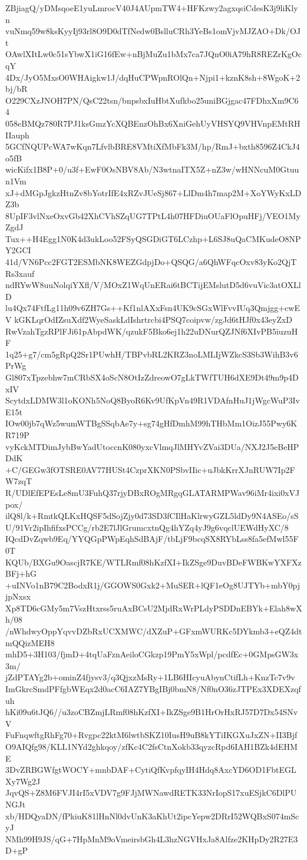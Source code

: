 ZBjiagQ/yDMsqoeE1yuLmrocV40J4AUpmTW4+HFKzwy2agxqsiCdesK3j9liKlyn
vuNmq59w8ksKyyIj93rl8O9D0dTfNedw0BslluCRh3YeBs1omVjvMJZAO+Dk/OJt
OAwlXItLw0c51sYbwX1iG16fEw+nBjMuZu1bMx7ca7JQnO0iA79hR8REZrKgOcqY
4Dx/JyO5MxsO0WHAigkw1J/dqHuCPWpnROlQn+Njpi1+kznK8sh+8WgoK+2bj/bR
O229CXzJNOH7PN/QsC22tsn/bnpsbxIuHbtXufkbo25uniBGjgac47FDhxXm9C64
058eBMQz780R7PJ1ksGmzYcXQBEnzOhBx6XniGehUyVHSYQ9VHVnpEMtRHIIauph
5GCfNQUPcWA7wKqn7LfvlbBRE8VMtiXfMbFk3M/hp/RmJ+bxth8596Z4CkJ4o5fB
wicKifx1B8P+0/u3f+EwF0OsNBV8Ab/N3wtnaITX5Z+nZ3w/wHNNcuM0Gtuun1Vm
xJ+dMGpJgkzHtnZv8bYotrIfE4xRZvJUeSj867+LlDm4h7map2M+XoYWyKxLDZ3b
8UpIF3vlNxeOxvGb42XhCVhSZqUG7TPtL4h07HFDiuOUaFlOpuHFj/VEO1MyZgdJ
Tux++H4Egg1N0K4d3ukLoo52FSyQSGDiGT6LCzhp+L6SJ8uQaCMKudeO8NPY2GCI
41d/VN6Pcc2FGT2ESMbNK8WEZGdpjDo+QSQG/a6QhWFqcOxv83yKo2QjTRs3xauf
ndRYwW8uuNolqiYXfl/V/MOxZ1WqUnERai6tBCTijEMslutD5d6vuVic3atOXLlD
lu4Qx74FtfLg11h09v6ZH7Gs++Kf1nlAXxFsn4UK9cSGxWlFvvIUq3Qmjgg+cwEV
kGKLqrOdIZsuXdf2WyeSaskLdIshrtrcbi4PSQ7coipvw/zgJd6tHJf0x43eyZxD
RwVzahTgzRPlFJi61pAbpdWK/qzukF5Bko6ej1h22uDNurQZJNf6XIvPB5iuzuHF
1q25+g7/cm5gRpQ2Sr1PUwhH/TBPvbRL2KRZ3noLMLIjWZkcS3Sb3WihB3v6PrWg
Gl807xTpzebhw7mCRbSX4oScN8OtIzZdreowO7gLkTWfTUH6dXE9Dt49m9p4DxIV
ScytdxLDMW3l1oKONh5NoQ8ByoR6Kv9UfKpVn49R1VDAfnHuJ1jWgcWuP3IvE15t
IOw00jb7qWz5wumWTBgSSqbAe7y+sg74gHfDmhM99hTHbMm1OizJ55Pwy6KR719P
vyKckMTDimJybBwYadUtoccnK080yxcVlmqJlMHYvZVai3DUa/NXJ2J5eBeHPDdK
+C/GEGw3fOTSRE0AV77HUSt4CzprXKN0PSbvIIic+uJbkKrrXJnRUW7Ip2FW7zqT
R/UDlEfEPEsLe8mU3FuhQ37rjyDBxROgMRgqGLATARMPWav96iMr4ixi0xVJpox/
ilQ8l/k+RmtkQLKxHQSF5dSojZjy0d73SD3fCIlHaKlrwyGZL5ldDy9N4ASEo/sS
U/91Vr2ipIhfifxsPCCg/rb2E7lJlGrumcxtnQg4hYZq4yJ9g6vqclUEWdHyXC/8
IQcdDvZqwb9Eq/YYQGpPWpEqhSdBAjF/tbLjF9bcqSX8RYbLss8fa5efMwl55F0T
KQUb/BXGu9OascjR7KE/WTLRmf08hKzfXI+IkZSge9DuvBDeFWBKwYXFXzBFj+hG
+uINVo1nB79C2BodxR1j/GGOWS0Gxk2+MuSER+lQF1eOg8UJTYb+mbY0pjjpNxsx
Xp8TD6cGMy5m7VszHtxrss5ruAxBCsU2MjdRxWrPLdyPSDDnEBYk+Elah8wXh/08
/nWhdwyOppYqvvDZbRxUCXMWC/dXZuP+GFxmWURKc5DYkmb3+eQZ4dtmQQizMEH8
mhD5+3H103/fjmD+4tqUaFznAeiloCGkzp19PmY5xWpl/pcdfEc+0GMpsGW3x3m/
jZdPTAYg2b+ominZ4fjysv3/q3QjxzMsRy+1LB6HIcyuAbynCtifLh+KnzTc7v9v
ImGkrcSmdPFfgbWEqx2d0acC6IAZ7YBgIBj0bmN8/Nf0nO36zJTPEx3XDEXzqfuh
hKi09u6tJQ6//u3zoCBZmjLRmf08hKzfXI+IkZSge9B1HrOrHxRJ57D7Dx54SNvV
FuFnqwftgRhFg70+Rvgpc22ktM6lwtbSKZ10IusH9uB8kYTiIKGXuJxZN+II3Bjf
O9AIQfg98/KLL1NYd2ghkqoy/zfKc4C2fsCtnXokb33qyzcRpd6IAH1BZk4dEHME
3DvZRBGWfgtWOCY+mnbDAF+CytiQfKvpfqyIH4Hdq8AxcYD6OD1FbtEGLXy7Wg2J
JqvQS+Z8M6FVJI4rI5xVDV7g9FJjMWNawdRETK33NrIopS17xuESjkC6DlPUNGJt
xb/HDQyaDN/fPkiuK81lHnNl0dvUnK3aKhUt2ipcYepw2DRrI52WQBxS074mScyJ
NMh99H9JS/qG+7HpMnM9oVmeirsbGh4L3hzNGVHxJa8Alfze2KHpDy2R27E3D+gP
